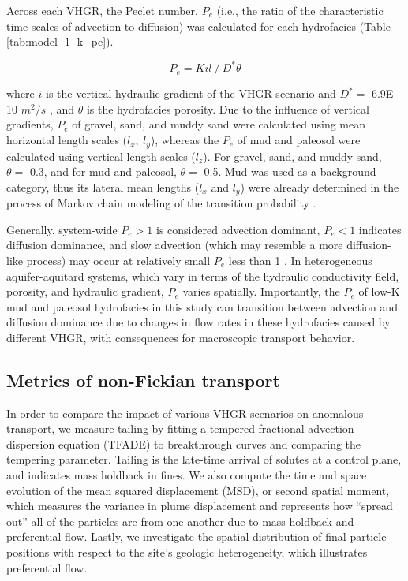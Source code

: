 Across each VHGR, the Peclet number, $P_e$ (i.e., the ratio of the characteristic time scales of advection to diffusion) was calculated for each hydrofacies (Table \ref{tab:model_l_k_pe}).

\begin{equation}
    P_e = K i l \: / \: D^* \theta
\label{eq:pe}
\end{equation}

where $i$ is the vertical hydraulic gradient of the VHGR scenario and $D^* =$ 6.9E-10 $m^2/s$ \citep{weissmann2004influence, weissmann2002modeling}, and $\theta$ is the hydrofacies porosity. Due to the influence of vertical gradients, $P_e$ of gravel, sand, and muddy sand were calculated using mean horizontal length scales ($l_x, \: l_y$), whereas the $P_e$ of mud and paleosol were calculated using vertical length scales ($l_z$). For gravel, sand, and muddy sand, $\theta =$ 0.3, and for mud and paleosol, $\theta =$ 0.5. Mud was used as a background category, thus its lateral mean lengths ($l_x$ and $l_y$) were already determined in the process of Markov chain modeling of the transition probability \citep{weissmann1999three}.


Generally, system-wide $P_e > 1$ is considered advection dominant, $P_e < 1$ indicates diffusion dominance, and slow advection (which may resemble a more diffusion-like process) may occur at relatively small $P_e$ less than 1 \citep{guswa2000slow}. In heterogeneous aquifer-aquitard systems, which vary in terms of the hydraulic conductivity field, porosity, and hydraulic gradient, $P_e$ varies spatially. Importantly, the $P_e$ of low-K mud and paleosol hydrofacies in this study can transition between advection and diffusion dominance due to changes in flow rates in these hydrofacies caused by different VHGR, with consequences for macroscopic transport behavior. 






%
%
\subsection{Metrics of non-Fickian transport}
\label{ss_2_5}

In order to compare the impact of various VHGR scenarios on anomalous transport, we measure tailing by fitting a tempered fractional advection-dispersion equation (TFADE) to breakthrough curves and comparing the tempering parameter. Tailing is the late-time arrival of solutes at a control plane, and indicates mass holdback in fines. We also compute the time and space evolution of the mean squared displacement (MSD), or second spatial moment, which measures the variance in plume displacement and represents how ``spread out'' all of the particles are from one another due to mass holdback and preferential flow. Lastly, we investigate the spatial distribution of final particle positions with respect to the site's geologic heterogeneity, which illustrates preferential flow.

